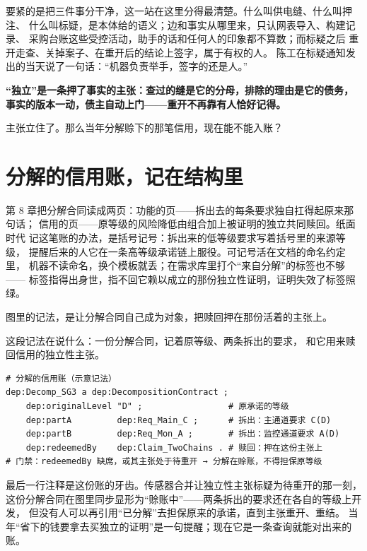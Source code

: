 要紧的是把三件事分干净，这一站在这里分得最清楚。什么叫供电缝、什么叫押注、
什么叫标疑，是本体给的语义；边和事实从哪里来，只认网表导入、构建记录、
采购台账这些受控活动，助手的话和任何人的印象都不算数；而标疑之后
重开走查、关掉案子、在重开后的结论上签字，属于有权的人。
陈工在标疑通知发出的当天说了一句话：“机器负责举手，签字的还是人。”

\textbf{“独立”是一条押了事实的主张：查过的缝是它的分母，排除的理由是它的债务，事实的版本一动，债主自动上门——重开不再靠有人恰好记得。}

主张立住了。那么当年分解赊下的那笔信用，现在能不能入账？

\section{分解的信用账，记在结构里}

第 8 章把分解合同读成两页：功能的页——拆出去的每条要求独自扛得起原来那句话；
信用的页——原等级的风险降低由组合加上被证明的独立共同赎回。纸面时代
记这笔账的办法，是括号记号：拆出来的低等级要求写着括号里的来源等级，
提醒后来的人它在一条高等级承诺链上服役。可记号活在文档的命名约定里，
机器不读命名，换个模板就丢；在需求库里打个“来自分解”的标签也不够——
标签指得出身世，指不回它赖以成立的那份独立性证明，证明失效了标签照绿。

图里的记法，是让分解合同自己成为对象，把赎回押在那份活着的主张上。

这段记法在说什么：一份分解合同，记着原等级、两条拆出的要求，
和它用来赎回信用的独立性主张。

\nopagebreak[4]
\begin{codebox}
\begin{Verbatim}[fontsize=\small,breaklines=true,breakanywhere=true,breaksymbolleft={},breaksymbolright={}]
# 分解的信用账（示意记法）
dep:Decomp_SG3 a dep:DecompositionContract ;
    dep:originalLevel "D" ;                 # 原承诺的等级
    dep:partA         dep:Req_Main_C ;      # 拆出：主通道要求 C(D)
    dep:partB         dep:Req_Mon_A ;       # 拆出：监控通道要求 A(D)
    dep:redeemedBy    dep:Claim_TwoChains . # 赎回：押在这份主张上
# 门禁：redeemedBy 缺席，或其主张处于待重开 → 分解在赊账，不得担保原等级
\end{Verbatim}
\end{codebox}

最后一行注释是这份账的牙齿。传感器合并让独立性主张标疑为待重开的那一刻，
这份分解合同在图里同步显形为“赊账中”——两条拆出的要求还在各自的等级上开发，
但没有人可以再引用“已分解”去担保原来的承诺，直到主张重开、重结。
当年“省下的钱要拿去买独立的证明”是一句提醒；现在它是一条查询就能对出来的账。

